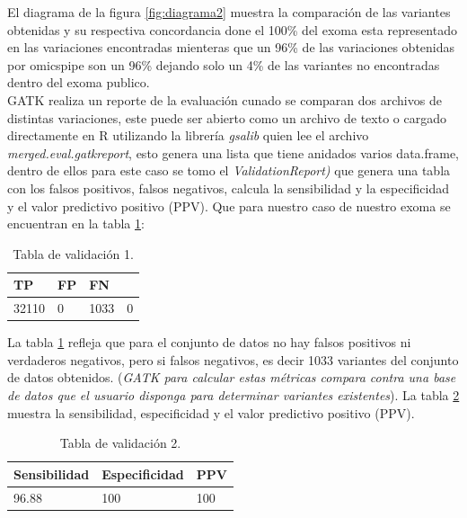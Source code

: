 El diagrama de la figura \ref{fig:diagrama2} muestra la comparación de las variantes obtenidas y su respectiva concordancia done el 100\% del exoma esta representado en las variaciones encontradas mienteras que un 96\% de las variaciones obtenidas por omicspipe son un 96\% dejando solo un 4\% de las variantes no encontradas dentro del exoma publico. \\

GATK realiza un reporte de la evaluación cunado se comparan dos archivos de distintas variaciones, este puede ser abierto como un archivo de texto o cargado directamente en R utilizando la librería \textit{gsalib} quien lee el archivo \textit{merged.eval.gatkreport}, esto genera una lista que tiene anidados varios data.frame, dentro de ellos para este caso se tomo el \textit{ValidationReport)} que genera una tabla con los falsos positivos, falsos negativos, calcula la sensibilidad y la especificidad  y el valor predictivo positivo (PPV). Que para nuestro caso de nuestro exoma se encuentran en la tabla \ref{tabla:tabla3}:

\begin{table}[H]
	\begin{center}
		\begin{tabular}{|l|l|l|l|}
			\hline 
			\textbf{TP} & \textbf{FP} & \textbf{FN} & \text{TN} \\
			\hline 
			32110 & 0 & 1033 & 0 \\ \hline
		\end{tabular}
		\caption{Tabla de validación 1.}
		\label{tabla:tabla3}
	\end{center}
\end{table}

La tabla \ref{tabla:tabla3} refleja que para el conjunto de datos no hay falsos positivos ni verdaderos negativos, pero si falsos negativos, es decir 1033 variantes del conjunto de datos obtenidos. (\textit{GATK para calcular estas métricas compara contra una base de datos que el usuario disponga para determinar variantes existentes}).  La tabla \ref{tabla:tabla4} muestra la sensibilidad, especificidad y el valor predictivo positivo (PPV).

\begin{table}[H]
	\begin{center}
		\begin{tabular}{|l|l|l|}
			\hline 
			\textbf{Sensibilidad} & \textbf{Especificidad} & \textbf{PPV} \\
			\hline 
			96.88 & 100 & 100 \\ \hline
		\end{tabular}
		\caption{Tabla de validación 2.}
		\label{tabla:tabla4}
	\end{center}
\end{table}

